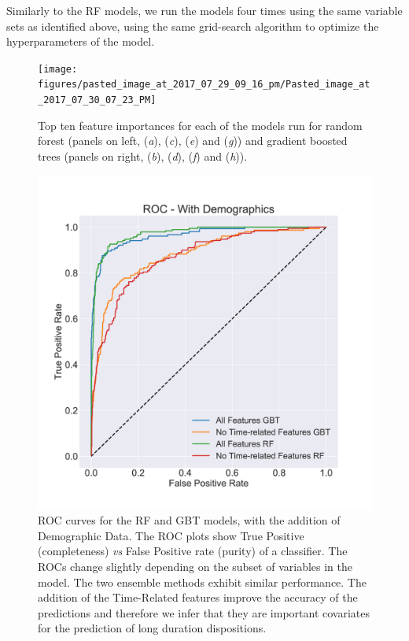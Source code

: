 \documentclass{AISB2008}
\begin{document}
Similarly to the RF models, we run the models four times using the
same variable sets as identified above, using the same grid-search
algorithm to optimize the hyperparameters of the model.


\begin{figure}[h!]
\begin{center}
\texttt{[image: figures/pasted\_image\_at\_2017\_07\_29\_09\_16\_pm/Pasted\_image\_at\_2017\_07\_30\_07\_23\_PM]}
\caption{Top ten feature importances for each of the models run for random forest (panels on left, (\textit{a}), (\textit{c}), (\textit{e}) and (\textit{g})) and gradient boosted trees (panels on right, (\textit{b}), (\textit{d}), (\textit{f}) and (\textit{h})). 
\label{fig:featureimportances}%
}
\end{center}
\end{figure}

\begin{figure}[h!]
\begin{center}
\includegraphics[width=0.70\columnwidth]{figures/roc_curve_rf2/ROC_wdemo}
\caption{ROC curves for the RF and GBT models, with the addition of Demographic Data. The ROC plots show True Positive (completeness) {\it vs} False Positive rate (purity) of a classifier. The ROCs change slightly depending on the subset of variables in the model. The two ensemble methods exhibit similar performance. The addition of the Time-Related features improve the accuracy of the predictions and therefore we infer that they are important covariates for the prediction of long duration dispositions.
\label{fig:demoROC}%
}
\end{center}
\end{figure}
\end{document}
